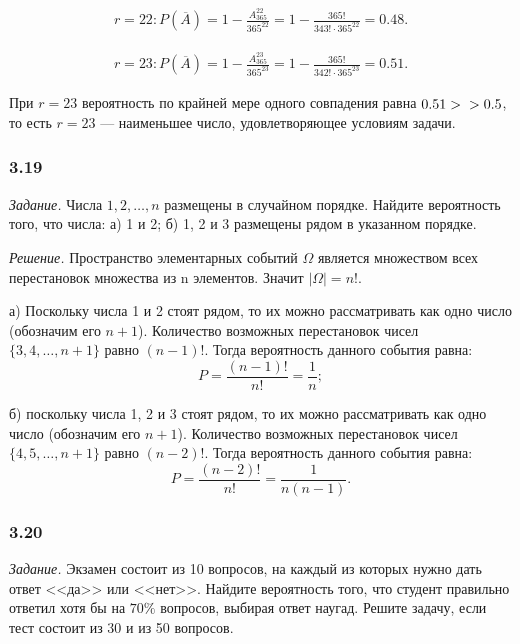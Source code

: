 \documentclass{book}
\begin{document}
\begin{equation*}
\begin{split}
r = 22 :
P \left( \overline{A} \right) =
1 - \frac{A_{365}^{22}}{365^{22}} =
1 - \frac{365!}{343! \cdot 365^{22}} =
0.48.
\end{split}
\end{equation*}

\begin{equation*}
\begin{split}
r = 23 :
P \left( \overline{A} \right) =
1 - \frac{A_{365}^{23}}{365^{23}} =
1 - \frac{365!}{342! \cdot 365^{23}} =
0.51.
\end{split}
\end{equation*}

При
$ r = 23 $
вероятность по крайней мере одного совпадения равна
$ 0.51 > \\
> 0.5 $,
то есть
$ r = 23 $ ---
наименьшее число, удовлетворяющее условиям задачи.

\subsubsection*{3.19}

\textit{Задание.} Числа $ 1, 2,  \dotsc , n $ размещены в случайном порядке.
Найдите вероятность того, что числа:
а) 1 и 2;
б) 1, 2 и 3 размещены рядом в указанном порядке.

\textit{Решение.} Пространство элементарных событий $  \Omega$ является множеством всех перестановок множества из n элементов.
Значит $ |\Omega| = n! $.

а) Поскольку числа 1 и 2 стоят рядом, то их можно рассматривать как одно число (обозначим его $ n + 1 $).
Количество возможных перестановок чисел $ \{ 3, 4,  \dotsc , n + 1 \} $ равно $ \left( n - 1 \right)! $.
Тогда вероятность данного события равна:
$$ P =
\frac{ \left( n - 1 \right)! }{ n! } =
\frac{1}{n};$$

б) поскольку числа 1, 2 и 3 стоят рядом, то их можно рассматривать как одно число (обозначим его $ n + 1 $).
Количество возможных перестановок чисел $ \{ 4, 5,  \dotsc , n + 1 \} $ равно $ \left( n - 2 \right)! $.
Тогда вероятность данного события равна:
$$ P = \frac{ \left( n - 2 \right)!}{ n! } =
\frac{1}{ n (n - 1 ) }.$$

\subsubsection*{3.20}

\textit{Задание.} Экзамен состоит из 10 вопросов, на каждый из которых нужно дать ответ <<да>> или <<нет>>.
Найдите вероятность того, что студент правильно ответил хотя бы на $ 70 \% $ вопросов, выбирая ответ наугад.
Решите задачу, если тест состоит из 30 и из 50 вопросов.
\end{document}
